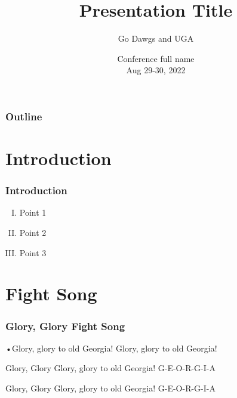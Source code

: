 \documentclass[10pt]{beamer}
\title[Title]{Presentation Title}%
\author[Go Dawgs]{Go Dawgs\inst{1} and UGA\inst{1}}%
\institute[UGA]{The University of Georgia\inst{1}}
\date[\textcolor{white}{Conference Name, 2022}]
{Conference full name\\
Aug 29-30, 2022}
\begin{document}
\frame{\titlepage}

\begin{frame}
\frametitle{Outline}
\tableofcontents
\end{frame}


\section{Introduction} 
\begin{frame}
\frametitle{Introduction}
\begin{enumerate}[(I)]
\item Point 1
\vspace{3mm}
\vspace{3mm}
\item Point 2 
\vspace{3mm}
\vspace{3mm}
\item Point 3 
\end{enumerate}
\end{frame}

\section{Fight Song} 
\begin{frame}
\frametitle{Glory, Glory Fight Song}
•Glory, glory to old Georgia!
Glory, glory to old Georgia!
\vspace{3mm}
\begin{alertblock}{Glory, Glory}
Glory, glory to old Georgia!
G-E-O-R-G-I-A
\end{alertblock}
\vspace{3mm}
\vspace{3mm}
\begin{block}{Glory, Glory}
Glory, glory to old Georgia!
G-E-O-R-G-I-A
\end{block}
\end{frame}
\end{document}
